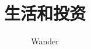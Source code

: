 \documentclass[12pt,oneside]{book}
\begin{document}
\title{生活和投资}
\author{Wander}

\makemytitle
\end{document}
